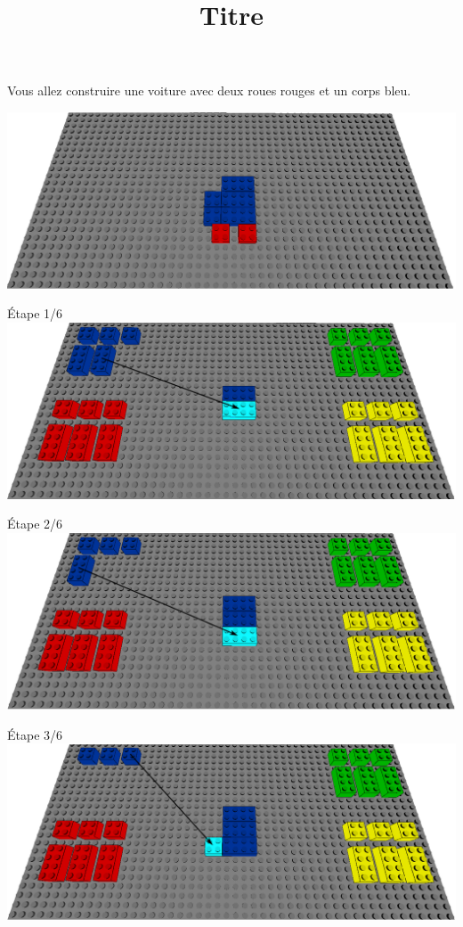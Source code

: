 \documentclass[aspectratio=169]{beamer}
\title{Titre}
\begin{document}
\begin{frame}
    Vous allez construire une voiture avec deux roues rouges et un corps bleu.
    \vfill
    \begin{center}
        \includegraphics[width=\linewidth]{figure.png}
    \end{center}
\end{frame}

\begin{frame}
    Étape 1/6
    \vfill
  \includegraphics[width=\linewidth]{step1.png}
\end{frame}

\begin{frame}
    Étape 2/6
    \vfill
  \includegraphics[width=\linewidth]{step2.png}
\end{frame}

\begin{frame}
    Étape 3/6
    \vfill
  \includegraphics[width=\linewidth]{step3.png}
\end{frame}
\end{document}
